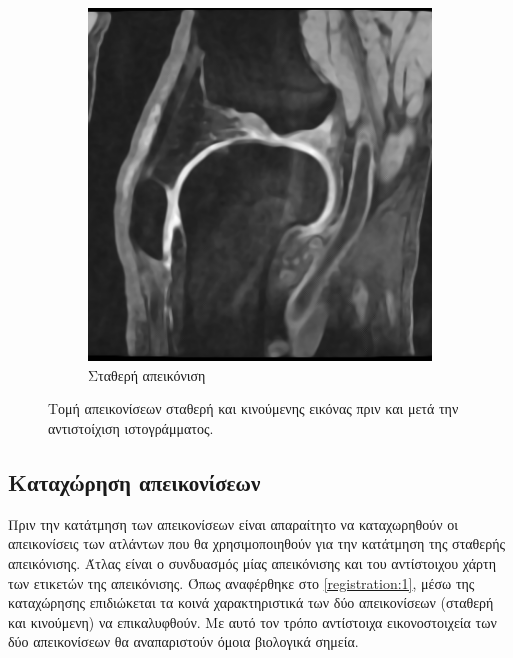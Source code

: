 \documentclass[a4paper,12pt]{article}
\begin{document}
\begin{figure}[H]
    \begin{subfigure}[t]{0.4\linewidth}
    \includegraphics[width=\linewidth]{curvature_1.png}
    \caption{Σταθερή απεικόνιση}
    \end{subfigure}

    \caption{Τομή απεικονίσεων σταθερή και κινούμενης εικόνας πριν και μετά την
             αντιστοίχιση ιστογράμματος.}
    \label{fig:histogram_matching:2}
\end{figure}


\subsection{Καταχώρηση απεικονίσεων}

Πριν την κατάτμηση των απεικονίσεων είναι απαραίτητο να καταχωρηθούν οι
απεικονίσεις των ατλάντων που θα χρησιμοποιηθούν για την κατάτμηση της σταθερής
απεικόνισης. Άτλας είναι ο συνδυασμός μίας απεικόνισης και του αντίστοιχου χάρτη
των ετικετών της απεικόνισης. Όπως αναφέρθηκε στο \ref{registration:1}, μέσω της
καταχώρησης επιδιώκεται τα κοινά χαρακτηριστικά των δύο απεικονίσεων (σταθερή
και κινούμενη) να επικαλυφθούν. Με αυτό τον τρόπο αντίστοιχα εικονοστοιχεία των
δύο απεικονίσεων θα αναπαριστούν όμοια βιολογικά σημεία.
\end{document}
